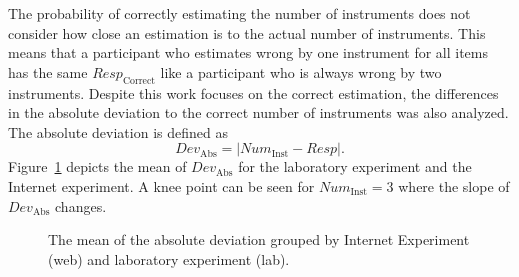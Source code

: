 \par
The probability of correctly estimating the number of instruments does not consider how close an estimation is to the actual number of instruments. This means that a participant who estimates wrong by one instrument for all items has the same $\textit{Resp}_{\mathrm{Correct}}$ like a participant who is always wrong by two instruments. Despite this work focuses on the correct estimation, the differences in the absolute deviation to the correct number of instruments was also analyzed. The absolute deviation is defined as
\begin{equation}
\textit{Dev}_{\mathrm{Abs}} = | \textit{Num}_{\mathrm{Inst}} - \textit{Resp} |
\mathrm{.}
\label{equation:absolute_deviation}
\end{equation}
Figure~\ref{figure:absolute_deviation} depicts the mean of $\textit{Dev}_{\mathrm{Abs}}$ for the laboratory experiment and the Internet experiment. A knee point can be seen for $\textit{Num}_{\mathrm{Inst}} = 3$ where the slope of $\textit{Dev}_{\mathrm{Abs}}$ changes.

\begin{figure}[t]
\centering
\vspace{0.38cm}
\caption{The mean of the absolute deviation grouped by Internet Experiment (web) and laboratory experiment (lab).}
\label{figure:absolute_deviation}
\end{figure}


